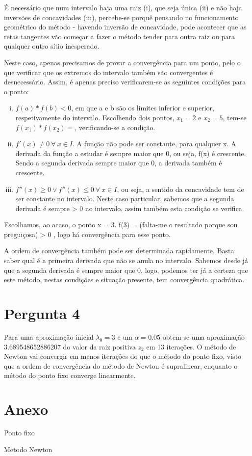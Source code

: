 \documentclass[a4paper, 18pt]{article}
\begin{document}
	\par
	É necessário que num intervalo haja uma raiz (i), que seja única (ii) e não haja inversões de concavidades (iii),
	percebe-se porquê pensando no funcionamento geométrico do método - havendo inversão de concavidade, pode
	acontecer que as retas tangentes vão começar a fazer o método tender para outra raiz ou para qualquer outro sítio inesperado.
	
	Neste caso, apenas precisamos de provar a convergência para um ponto, pelo o que verificar que os extremos do intervalo também são convergentes é desnecessário. Assim, é apenas preciso verificarem-se as seguintes condições para o ponto:

	\begin{enumerate}[i)]
	\item $f(a)*f(b) < 0$, em que a e b são os limites inferior e superior, respetivamente do intervalo.
	Escolhendo dois pontos, $x_1 = 2$ e $x_2 = 5$, tem-se $f(x_1) * f(x_2) = $, verificando-se a condição. 

	\item $f'(x) \neq 0 \> \forall \> x \in I$. A função não pode ser constante, para qualquer x.
	A derivada da função a estudar é sempre maior que 0, ou seja, f(x) é crescente. Sendo a segunda derivada sempre maior que 0, a derivada também é crescente.

	\item $f''(x) \geqslant 0 \vee f''(x) \leqslant 0 \> \forall \> x \in I$, ou seja, a sentido da concavidade tem de ser constante no intervalo.
	Neste caso particular, sabemos que a segunda derivada é sempre > 0 no intervalo, assim também esta condição se verifica.
	\end{enumerate}

	Escolhamos, ao acaso, o ponto x = 3. f(3) = (falta-me o resultado porque sou preguiçosa) > 0 , logo há convergência para esse ponto.

	A ordem de convergência também pode ser determinada rapidamente. Basta saber qual é a primeira derivada que não se anula no intervalo. Sabemos desde já que a segunda derivada é sempre maior que 0, logo, podemos ter já a certeza que este método, nestas condições e situação presente, tem convergência quadrática.

\section{Pergunta 4}
	\par Para uma aproximação inicial $\lambda _0 = 3$ e um $\alpha = 0.05$ obtem-se uma aproximação 3.689548652886207 do valor da raiz positiva $z_2$ em 13 iterações. 
	O método de Newton vai convergir em menos iterações do que o método do ponto fixo, visto que a ordem de convergência do método de Newton é supralinear, enquanto o método do ponto fixo converge linearmente.


\section{Anexo}

\par{Ponto fixo}
	

\par{Metodo Newton}
	
\end{document}

